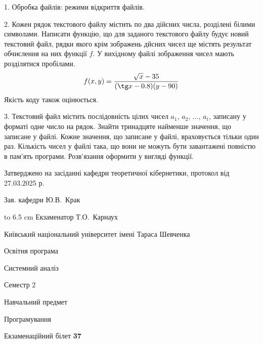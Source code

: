 \documentclass[12pt, ukrainian]{article}
\begin{document}
{%
1. Обробка файлів: режими відкриття файлів.%
\par
\vspace{2mm}

2. Кожен рядок текстового файлу містить по два дійсних числа, розділені білими символами.
Написати функцію, що для заданого текстового файлу будує новий текстовий файл, рядки якого крім зображень дйсних чисел ще містять результат обчислення на них функції $f$. У вихідному файлі зображення чисел мають розділятися пробілами. 
$$f(x, y) =\frac{\sqrt x - 35}{(\tg x - 0.8) (y - 90)}$$ 
Якість коду також оцінюється.

\par
\vspace{2mm}

3. Текстовий файл містить послідовність цілих чисел $a_1$, $a_2$, $\ldots$, $a_t$, записану у форматі одне число на рядок. Знайти тринадцяте найменше значення, що записане у файлі. Кожне значення, що записане у файлі, враховується тільки один раз. Кількість чисел у файлі така, що вони не можуть бути завантажені повністю в пам'ять програми. Розв'язання оформити у вигляді функції.

}
{\smallskip\smallskip \begin {scriptsize} Затверджено на засіданні кафедри теоретичної кібернетики, протокол   від   27.03.2025 р.\par\smallskip\smallskip\smallskip\smallskip
{\parbox {6.5 cm} {Зав. кафедри \dotfill Ю.В.~Крак}}\hspace {0.7cm} {\hbox to 6.5 cm { Екзаменатор \dotfill Т.О.~Карнаух}} \end{scriptsize}}
\newpage
{{\begin {scriptsize}\par
{ \center  Київський національний університет імені Тараса Шевченка \par}
{\parbox {5 cm}{Освітня програма \hfill}{\parbox {7 cm}{Системний аналіз\hfill}}\parbox {6 cm}{\hfill Семестр 2}}\par
{\parbox {5 cm} {Навчальний предмет \hfill}\parbox {7 cm}{Програмування \hfill}\parbox {6cm}{\hfill}\par}\vspace{-15pt} \end{scriptsize}}{\center Екзаменаційний білет \No \textbf { 37 }\par}}
\end{document}
